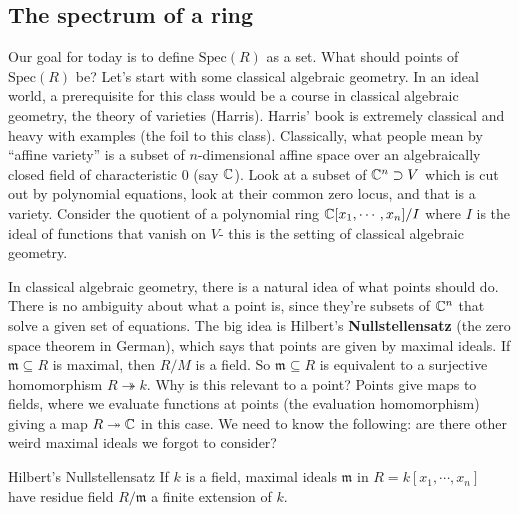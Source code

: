 \subsection{The spectrum of a ring}
Our goal for today is to define $\mathrm{Spec}(R)$ as a set. What should points of $\mathrm{Spec}(R)$ be? Let's start with some classical algebraic geometry. In an ideal world, a prerequisite for this class would be a course in classical algebraic geometry, the theory of varieties (Harris). Harris' book is extremely classical and heavy with examples (the foil to this class). Classically, what people mean by ``affine variety'' is a subset of $n$-dimensional affine space over an algebraically closed field of characteristic 0 (say $\mathbb{C}$). Look at a subset of $\mathbb{C}^n \supset V$ which is cut out by polynomial equations, look at their common zero locus, and that is a variety. Consider the quotient of a polynomial ring $\mathbb{C}[x_1 ,\cdots ,x_n ] / I$ where $I$ is the ideal of functions that vanish on $V$- this is the setting of classical algebraic geometry.

In classical algebraic geometry, there is a natural idea of what points should do. There is no ambiguity about what a point is, since they're subsets of $\mathbb{C}^n $ that solve a given set of equations. The big idea is Hilbert's \textbf{Nullstellensatz} (the zero space theorem in German), which says that points are given by maximal ideals. If $\mathfrak m \subseteq R$ is maximal, then $R /M$ is a field. So $\mathfrak m \subseteq R$ is equivalent to a surjective homomorphism $R \twoheadrightarrow k$. Why is this relevant to a point? Points give maps to fields, where we evaluate functions at points (the evaluation homomorphism) giving a map $R \twoheadrightarrow \mathbb{C}$ in this case. We need to know the following: are there other weird maximal ideals we forgot to consider?

\begin{namedthm}{Hilbert's Nullstellensatz} 
    If $k$ is a field, maximal ideals $\mathfrak m $ in $R=k[x_1, \cdots ,x_n ]$ have residue field $R / \mathfrak m$ a finite extension of $k$.
\end{namedthm}

